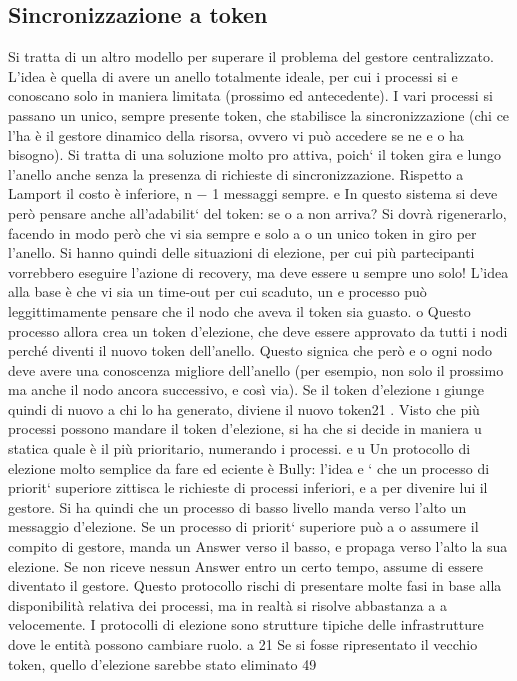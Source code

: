 \documentclass[a4paper,12pt]{article}
\begin{document}
\subsection{Sincronizzazione a token}
Si tratta di un altro modello per superare il problema del gestore centralizzato. L'idea è quella di avere un anello
totalmente ideale, per cui i processi si
e
conoscano solo in maniera limitata (prossimo ed antecedente). I vari processi
si passano un unico, sempre presente token, che stabilisce la sincronizzazione
(chi ce l'ha è il gestore dinamico della risorsa, ovvero vi può accedere se ne
e
o
ha bisogno). Si tratta di una soluzione molto pro attiva, poich` il token gira
e
lungo l'anello anche senza la presenza di richieste di sincronizzazione. Rispetto
a Lamport il costo è inferiore, n $-$ 1 messaggi sempre.
e
In questo sistema si deve però pensare anche all'adabilit` del token: se
o
a
non arriva? Si dovrà rigenerarlo, facendo in modo però che vi sia sempre e solo
a
o
un unico token in giro per l'anello. Si hanno quindi delle situazioni di elezione,
per cui più partecipanti vorrebbero eseguire l'azione di recovery, ma deve essere
u
sempre uno solo! L'idea alla base è che vi sia un time-out per cui scaduto, un
e
processo può leggittimamente pensare che il nodo che aveva il token sia guasto.
o
Questo processo allora crea un token d'elezione, che deve essere approvato da
tutti i nodi perché diventi il nuovo token dell'anello. Questo signica che però
e
o
ogni nodo deve avere una conoscenza migliore dell'anello (per esempio, non solo
il prossimo ma anche il nodo ancora successivo, e così via). Se il token d'elezione
\i{}
giunge quindi di nuovo a chi lo ha generato, diviene il nuovo token21 . Visto che
più processi possono mandare il token d'elezione, si ha che si decide in maniera
u
statica quale è il più prioritario, numerando i processi.
e
u
Un protocollo di elezione molto semplice da fare ed eciente è Bully: l'idea
e
` che un processo di priorit` superiore zittisca le richieste di processi inferiori,
e
a
per divenire lui il gestore. Si ha quindi che un processo di basso livello manda
verso l'alto un messaggio d'elezione. Se un processo di priorit` superiore può
a
o
assumere il compito di gestore, manda un Answer verso il basso, e propaga verso
l'alto la sua elezione. Se non riceve nessun Answer entro un certo tempo, assume
di essere diventato il gestore. Questo protocollo rischi di presentare molte fasi
in base alla disponibilità relativa dei processi, ma in realtà si risolve abbastanza
a
a
velocemente. I protocolli di elezione sono strutture tipiche delle infrastrutture
dove le entità possono cambiare ruolo.
a
21 Se
si fosse ripresentato il vecchio token, quello d'elezione sarebbe stato eliminato
49
\end{document}
